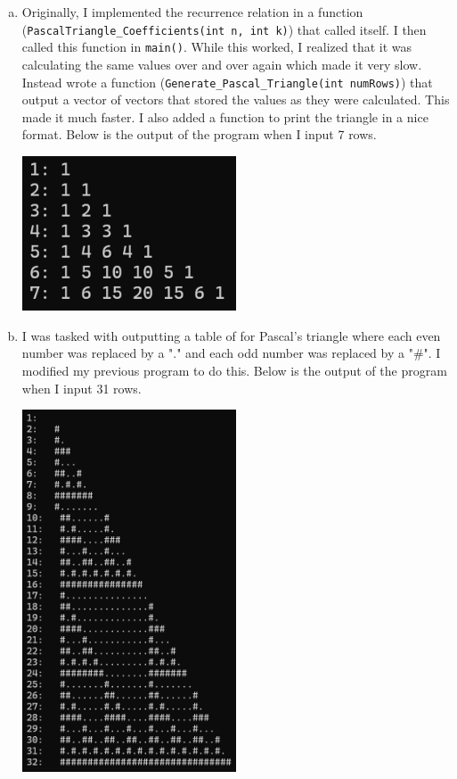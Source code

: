 \documentclass{article}
\begin{document}
\begin{enumerate}[a)]
    \item Originally, I implemented the recurrence relation in a function (\verb|PascalTriangle_Coefficients(int n, int k)|) that called itself. I then called this function in \verb|main()|. While this worked, I realized that it was calculating the same values over and over again which made it very slow. Instead wrote a function (\verb|Generate_Pascal_Triangle(int numRows)|) that output a vector of vectors that stored the values as they were calculated. This made it much faster. I also added a function to print the triangle in a nice format. Below is the output of the program when I input 7 rows. \\ 
    \begin{center}
        \includegraphics[width=0.5\textwidth]{OpHw1_1a.png}
    \end{center}
    \newpage
    \item I was tasked with outputting a table of for Pascal's triangle where each even number was replaced by a "." and each odd number was replaced by a "\#". I modified my previous program to do this. Below is the output of the program when I input 31 rows. \\
    \begin{center}
        \includegraphics[width=0.5\textwidth]{OpHw1_1b.png}
    \end{center}
\end{enumerate}
\end{document}
